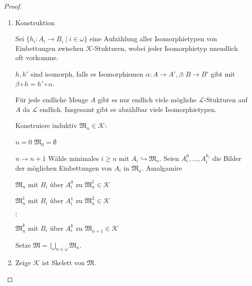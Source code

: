 \documentclass[12pt,parskip=full]{scrartcl}
\newcommand{\heading}{\underline}
\theoremstyle{definition}
\begin{document}
	\begin{proof}
		\begin{enumerate}
			\item Konstruktion
			
			Sei $\{ h_i: A_i \to B_i \mid i \in \omega \}$ eine Aufzählung aller Isomorphietypen von Einbettungen zwischen $\mathcal{K}$-Stukturen, wobei jeder Isomorphietyp unendlich oft vorkomme.
			
			\begin{center}
			\end{center}
		
			$h, h'$ sind isomorph, falls es Isomorphismen $\alpha: A \to A', \beta: B \to B'$ gibt mit $\beta \circ h = h' \circ \alpha$.
			
			Für jede endliche Menge $A$ gibt es nur endlich viele mögliche $\mathcal{L}$-Stukturen auf $A$ da $\mathcal{L}$ endlich. Insgesamt gibt es abzählbar viele Isomorphietypen.
			
			Konstruiere induktiv $\mathfrak{M}_n \in \mathcal{K}$:
			
			\heading{$n=0$} $\mathfrak{M}_0 = \emptyset$
			
			\heading{$n \to n + 1$} Wähle minimales $i \geq n$ mit $A_i \hookrightarrow \mathfrak{M}_n$. Seien $A_i^0, \dots, A_i^{k_i}$ die Bilder der möglichen Einbettungen von $A_i$ in $\mathfrak{M}_n$. Amalgamire
			
			$\mathfrak{M}_n$ mit $B_i$ über $A_i^0$ zu $\mathfrak{M}_n^1 \in \mathcal{K}$
			
			$\mathfrak{M}_n^1$ mit $B_i$ über $A_i^1$ zu $\mathfrak{M}_n^2 \in \mathcal{K}$
			
			$\vdots$
			
			$\mathfrak{M}_n^k$ mit $B_i$ über $A_i^k$ zu $\mathfrak{M}_{n+1} \in \mathcal{K}$
			
			Setze $\mathfrak{M} = \bigcup_{n \in \omega} \mathfrak{M}_n$.
			
			\item Zeige $\mathcal{K}$ ist Skelett von $\mathfrak{M}$.
			

\end{enumerate}
\end{proof}
\end{document}
